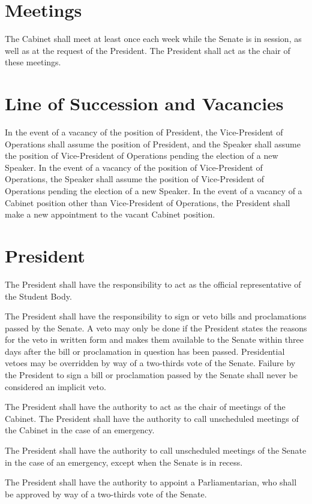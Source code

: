 \documentclass[12pt,oneside]{scrreprt}
\begin{document}
\section{Meetings}
The Cabinet shall meet at least once each week while the Senate is in session, as well as at the request of the President. The President shall act as the chair of these meetings.

\section{Line of Succession and Vacancies}
In the event of a vacancy of the position of President, the Vice-President of Operations shall assume the position of President, and the Speaker shall assume the position of Vice-President of Operations pending the election of a new Speaker. In the event of a vacancy of the position of Vice-President of Operations, the Speaker shall assume the position of Vice-President of Operations pending the election of a new Speaker. In the event of a vacancy of a Cabinet position other than Vice-President of Operations, the President shall make a new appointment to the vacant Cabinet position.

\section{President}
The President shall have the responsibility to act as the official representative of the Student Body.

The President shall have the responsibility to sign or veto bills and proclamations passed by the Senate. A veto may only be done if the President states the reasons for the veto in written form and makes them available to the Senate within three days after the bill or proclamation in question has been passed. Presidential vetoes may be overridden by way of a two-thirds vote of the Senate. Failure by the President to sign a bill or proclamation passed by the Senate shall never be considered an implicit veto.

The President shall have the authority to act as the chair of meetings of the Cabinet. The President shall have the authority to call unscheduled meetings of the Cabinet in the case of an emergency.

The President shall have the authority to call unscheduled meetings of the Senate in the case of an emergency, except when the Senate is in recess.

The President shall have the authority to appoint a Parliamentarian, who shall be approved by way of a two-thirds vote of the Senate.
\end{document}
